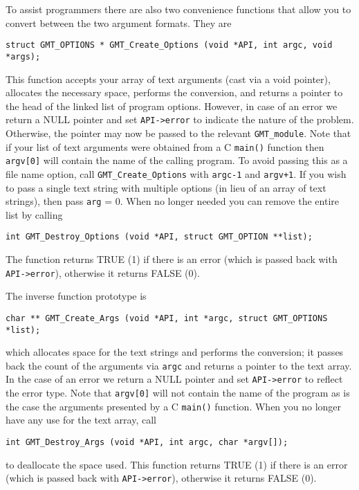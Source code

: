 \documentclass[11pt]{report}
\begin{document}
To assist programmers there are also two convenience functions that
allow you to convert between the two argument formats.  They are

\begin{verbatim}
struct GMT_OPTIONS * GMT_Create_Options (void *API, int argc, void *args);
\end{verbatim}
This function accepts your array of text arguments (cast via a void pointer), allocates the necessary
space, performs the conversion, and returns a pointer to the
head of the linked list of program options.  However, in case of an error
we return a NULL pointer and set \texttt{API->error} to indicate the nature of the problem.
Otherwise, the pointer may now be passed to the
relevant \texttt{GMT\_module}.  Note that if your list of text arguments
were obtained from a C \texttt{main()} function then \texttt{argv[0]} will
contain the name of the calling program.  To avoid passing this as a file
name option, call \texttt{GMT\_Create\_Options} with \texttt{argc-1}
and \texttt{argv+1}.  If you wish to pass a single text string with
multiple options (in lieu of an array of text strings), then pass \texttt{arg} = 0.
When no longer needed you can remove the entire list by calling
\begin{verbatim}
int GMT_Destroy_Options (void *API, struct GMT_OPTION **list);
\end{verbatim}
The function returns TRUE (1) if there is an error (which is passed back with \texttt{API->error}),
otherwise it returns FALSE (0).

The inverse function prototype is
\begin{verbatim}
char ** GMT_Create_Args (void *API, int *argc, struct GMT_OPTIONS *list);
\end{verbatim}
which allocates space for the text strings and performs the conversion;
it passes back the count of the arguments via \texttt{argc} and returns a pointer to the text array.
In the case of an error we return a NULL pointer and set \texttt{API->error} to reflect the error type.
Note that \texttt{argv[0]} will not contain the name of the program as
is the case the arguments presented by a C \texttt{main()} function.
When you no longer have any use for the text array, call
\begin{verbatim}
int GMT_Destroy_Args (void *API, int argc, char *argv[]);
\end{verbatim}
to deallocate the space used.  This function returns TRUE (1) if there is an error
(which is passed back with \texttt{API->error}),
otherwise it returns FALSE (0).
\end{document}
